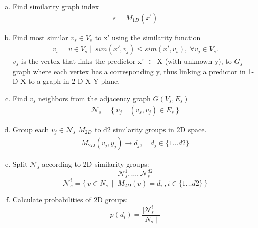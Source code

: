 \documentclass[a4paper]{article}
\begin{document}
\begin{enumerate}[(a)]

\item
  Find  similarity graph index
\begin{align*}
    s= M_{1D}( x^{'})
\end{align*}  
  \item
  Find most similar $v_s \in V_s$  to x' using the similarity function
  \begin{align*}
  v_s = v \in V_s \mid \ sim(x',v_j) \leq sim(x',v_s),\ \forall v_j \in V_s.
  \end{align*}
  $v_s$ is the vertex that links  the predictor x' $\in$ X (with unknown y), to 
  $G_s$ graph where each vertex has a corresponding y,
   thus linking a predictor in 1-D X to a graph in 2-D X-Y plane.
  \item
  Find $v_s$ neighbors from the  adjacency graph $G(V_s,E_s)$
\begin{align*}
    \mathcal{N}_s =  \lbrace  \  v_j  \mid \   (v_s,v_j)\in E_s\   \rbrace
\end{align*}  
 
  \item
  Group each $v_j\in \mathcal{N}_s$  $M_{2D}$
  to d2 similarity groups in 2D space.  
  \begin{align*}
  M_{2D}(v_j,y_j)\rightarrow d_j, \quad d_j\in\{1\dots d2\} 
  \end{align*}
  \item
  Split $\mathcal{N}_s$ according to 2D similarity groups:
   \begin{equation}
   \mathcal{N}_{s}^{1} ,\dots,\mathcal{N}_{s}^{d2}
 \end{equation}
  \begin{equation}
   \mathcal{N}_{s}^{i} = \{\  v \in N_s \  \mid \  M_{2D}(v) =d_i\   , i \in \{1\dots d2 \}\ \}
 \end{equation}
  \item Calculate probabilities of 2D  groups:\\
  \begin{equation}
  p(d_i)=\dfrac{\mid \mathcal{N}_{s}^{i}\mid }{ \mid  N_s\mid }
  \end{equation}
 

\end{enumerate}
\end{document}
